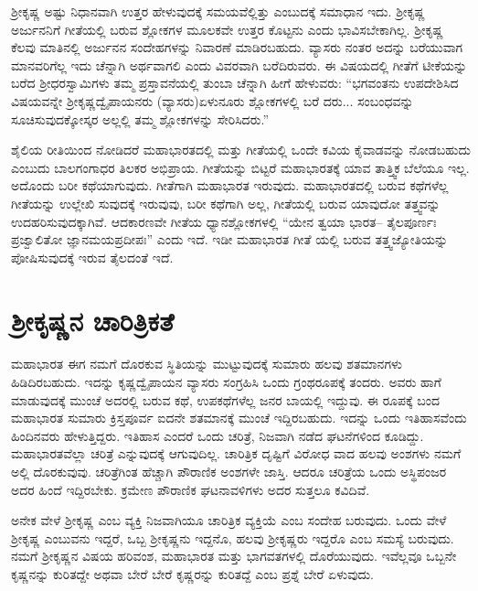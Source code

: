 ಶ್ರೀಕೃಷ್ಣ ಅಷ್ಟು ನಿಧಾನವಾಗಿ ಉತ್ತರ ಹೇಳುವುದಕ್ಕೆ ಸಮಯವೆಲ್ಲಿತ್ತು ಎಂಬುದಕ್ಕೆ ಸಮಾಧಾನ ಇದು. ಶ್ರೀಕೃಷ್ಣ ಅರ್ಜುನನಿಗೆ ಗೀತೆಯಲ್ಲಿ ಬರುವ ಶ್ಲೋಕಗಳ ಮೂಲಕವೇ ಉತ್ತರ ಕೊಟ್ಟನು ಎಂದು ಭಾವಿಸಬೇಕಾಗಿಲ್ಲ. ಶ್ರೀಕೃಷ್ಣ ಕೆಲವು ಮಾತಿನಲ್ಲಿ ಅರ್ಜುನನ ಸಂದೇಹಗಳನ್ನು ನಿವಾರಣೆ ಮಾಡಿರಬಹುದು. ವ್ಯಾಸರು ನಂತರ ಅದನ್ನು ಬರೆಯುವಾಗ ಮಾನವರಿಗೆಲ್ಲ ಇದು ಚೆನ್ನಾಗಿ ಅರ್ಥವಾಗಲಿ ಎಂದು ವಿವರವಾಗಿ ಬರೆದಿರುವರು. ಈ ವಿಷಯದಲ್ಲಿ ಗೀತೆಗೆ ಟೀಕೆಯನ್ನು ಬರೆದ ಶ್ರೀಧರಸ್ವಾಮಿಗಳು ತಮ್ಮ ಪ್ರಸ್ತಾವನೆಯಲ್ಲಿ ತುಂಬಾ ಚೆನ್ನಾಗಿ ಹೀಗೆ ಹೇಳುವರು: “ಭಗವಂತನು ಉಪದೇಶಿಸಿದ ವಿಷಯವನ್ನೇ ಶ್ರೀಕೃಷ್ಣದ್ವೈಪಾಯನರು (ವ್ಯಾಸರು)ಏಳುನೂರು ಶ್ಲೋಕಗಳಲ್ಲಿ ಬರೆ ದರು... ಸಂಬಂಧವನ್ನು ಸೂಚಿಸುವುದಕ್ಕೋಸ್ಕರ ಅಲ್ಲಲ್ಲಿ ತಮ್ಮ ಶ್ಲೋಕಗಳನ್ನು ಸೇರಿಸಿದರು.”

ಶೈಲಿಯ ರೀತಿಯಿಂದ ನೋಡಿದರೆ ಮಹಾಭಾರತದಲ್ಲಿ ಮತ್ತು ಗೀತೆಯಲ್ಲಿ ಒಂದೇ ಕವಿಯ ಕೈವಾಡವನ್ನು ನೋಡಬಹುದು ಎಂಬುದು ಬಾಲಗಂಗಾಧರ ತಿಲಕರ ಅಭಿಪ್ರಾಯ. ಗೀತೆಯನ್ನು ಬಿಟ್ಟರೆ ಮಹಾಭಾರತಕ್ಕೆ ಯಾವ ತಾತ್ತ್ವಿಕ ಬೆಲೆಯೂ ಇಲ್ಲ. ಅದೊಂದು ಬರೀ ಕಥೆಯಾಗುವುದು. ಗೀತೆಗಾಗಿ ಮಹಾಭಾರತ ಇರುವುದು. ಮಹಾಭಾರತದಲ್ಲಿ ಬರುವ ಕಥೆಗಳೆಲ್ಲ ಗೀತೆಯನ್ನು ಉಲ್ಲೇಖಿ ಸುವುದಕ್ಕೆ ಇರುವುವು, ಬರೀ ಕಥೆಗಾಗಿ ಅಲ್ಲ, ಗೀತೆಯಲ್ಲಿ ಬರುವ ಯಾವುದೋ ತತ್ತ್ವವನ್ನು ಉದಹರಿಸುವುದಕ್ಕಾಗಿವೆ. ಆದಕಾರಣವೇ ಗೀತೆಯ ಧ್ಯಾನಶ್ಲೋಕಗಳಲ್ಲಿ “ಯೇನ ತ್ವಯಾ ಭಾರತ– ತೈಲಪೂರ್ಣಃ ಪ್ರಜ್ವಾಲಿತೋ ಜ್ಞಾನಮಯಪ್ರದೀಪಃ” ಎಂದು ಇದೆ. ಇಡೀ ಮಹಾಭಾರತ ಗೀತೆ ಯಲ್ಲಿ ಬರುವ ತತ್ತ್ವಜ್ಯೋತಿಯನ್ನು ಪೋಷಿಸುವುದಕ್ಕೆ ಇರುವ ತೈಲದಂತೆ ಇದೆ.


\section*{ಶ್ರೀಕೃಷ್ಣನ ಚಾರಿತ್ರಿಕತೆ}

ಮಹಾಭಾರತ ಈಗ ನಮಗೆ ದೊರಕುವ ಸ್ಥಿತಿಯನ್ನು ಮುಟ್ಟುವುದಕ್ಕೆ ಸುಮಾರು ಹಲವು ಶತಮಾನಗಳು ಹಿಡಿದಿರಬಹುದು. ಇದನ್ನು ಕೃಷ್ಣದ್ವೈಪಾಯನ ವ್ಯಾಸರು ಸಂಗ್ರಹಿಸಿ ಒಂದು ಗ್ರಂಥರೂಪಕ್ಕೆ ತಂದರು. ಅವರು ಹಾಗೆ ಮಾಡುವುದಕ್ಕೆ ಮುಂಚೆ ಅದರಲ್ಲಿ ಬರುವ ಕಥೆ, ಉಪಕಥೆಗಳೆಲ್ಲ ಜನರ ಬಾಯಲ್ಲಿ ಇದ್ದುವು. ಈ ರೂಪಕ್ಕೆ ಬಂದ ಮಹಾಭಾರತ ಸುಮಾರು ಕ್ರಿಸ್ತಪೂರ್ವ ಐದನೇ ಶತಮಾನಕ್ಕೆ ಮುಂಚೆ ಇದ್ದಿರಬಹುದು. ಇದನ್ನು ಒಂದು ಇತಿಹಾಸವೆಂದು ಹಿಂದಿನವರು ಹೇಳುತ್ತಿದ್ದರು. ಇತಿಹಾಸ ಎಂದರೆ ಒಂದು ಚರಿತ್ರೆ, ನಿಜವಾಗಿ ನಡೆದ ಘಟನೆಗಳಿಂದ ಕೂಡಿದ್ದು. ಮಹಾಭಾರತವೆಲ್ಲಾ ಚರಿತ್ರೆ ಎನ್ನುವುದಕ್ಕೆ ಆಗುವುದಿಲ್ಲ. ಚಾರಿತ್ರಿಕ ದೃಷ್ಟಿಗೆ ವಿರೋಧ ವಾದ ಹಲವು ಅಂಶಗಳು ನಮಗೆ ಅಲ್ಲಿ ದೊರಕುವುವು. ಚರಿತ್ರೆಗಿಂತ ಹೆಚ್ಚಾಗಿ ಪೌರಾಣಿಕ ಅಂಶಗಳೇ ಜಾಸ್ತಿ. ಆದರೂ ಚರಿತ್ರೆಯ ಒಂದು ಅಸ್ಥಿಪಂಜರ ಅದರ ಹಿಂದೆ ಇದ್ದಿರಬೇಕು. ಕ್ರಮೇಣ ಪೌರಾಣಿಕ ಘಟನಾವಳಿಗಳು ಅದರ ಸುತ್ತಲೂ ಕವಿದಿವೆ.

ಅನೇಕ ವೇಳೆ ಶ್ರೀಕೃಷ್ಣ ಎಂಬ ವ್ಯಕ್ತಿ ನಿಜವಾಗಿಯೂ ಚಾರಿತ್ರಿಕ ವ್ಯಕ್ತಿಯೆ ಎಂಬ ಸಂದೇಹ ಬರುವುದು. ಒಂದು ವೇಳೆ ಶ್ರೀಕೃಷ್ಣ ಎಂಬುವನು ಇದ್ದರೆ, ಒಬ್ಬ ಶ್ರೀಕೃಷ್ಣನು ಇದ್ದನೊ, ಹಲವು ಶ್ರೀಕೃಷ್ಣರು ಇದ್ದರೊ ಎಂಬ ಸಮಸ್ಯೆ ಬರುವುದು. ನಮಗೆ ಶ್ರೀಕೃಷ್ಣನ ವಿಷಯ ಹರಿವಂಶ, ಮಹಾಭಾರತ ಮತ್ತು ಭಾಗವತಗಳಲ್ಲಿ ದೊರೆಯುವುದು. ಇವೆಲ್ಲವೂ ಒಬ್ಬನೇ ಕೃಷ್ಣನನ್ನು ಕುರಿತದ್ದೇ ಅಥವಾ ಬೇರೆ ಬೇರೆ ಕೃಷ್ಣರನ್ನು ಕುರಿತದ್ದೆ ಎಂಬ ಪ್ರಶ್ನೆ ಬೇರೆ ಏಳುವುದು.

